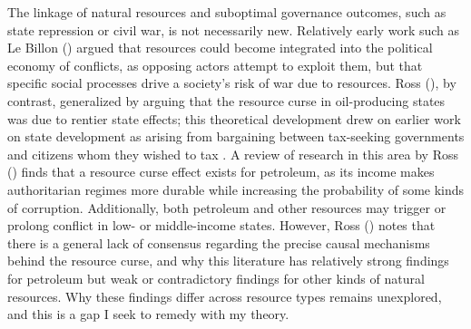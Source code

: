 The linkage of natural resources and suboptimal governance outcomes, such as state repression or civil war, is not necessarily new. Relatively early work such as Le Billon (\citeyear{LeBillon01}) argued that resources could become integrated into the political economy of conflicts, as opposing actors attempt to exploit them, but that specific social processes drive a society’s risk of war due to resources. Ross (\citeyear{Ross01}), by contrast, generalized by arguing that the resource curse in oil-producing states was due to rentier state effects; this theoretical development drew on earlier work on state development as arising from bargaining between tax-seeking governments and citizens whom they wished to tax \cite{BatesLien85}. A review of research in this area by Ross (\citeyear{Ross15}) finds that a resource curse effect exists for petroleum, as its income makes authoritarian regimes more durable while increasing the probability of some kinds of corruption. Additionally, both petroleum and other resources may trigger or prolong conflict in low- or middle-income states. However, Ross (\citeyear{Ross15}) notes that there is a general lack of consensus regarding the precise causal mechanisms behind the resource curse, and why this literature has relatively strong findings for petroleum but weak or contradictory findings for other kinds of natural resources. Why these findings differ across resource types remains unexplored, and this is a gap I seek to remedy with my theory.


